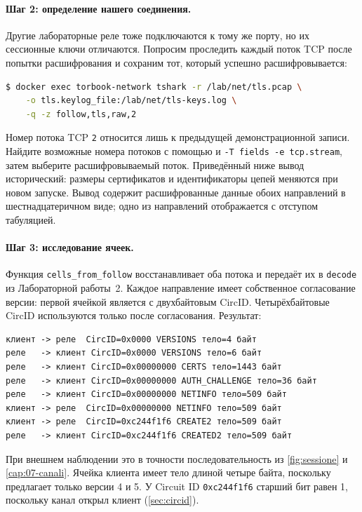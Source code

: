 \paragraph{Шаг 2: определение нашего соединения.} Другие лабораторные реле тоже подключаются к тому же порту, но их сессионные ключи отличаются. Попросим  проследить каждый поток TCP после попытки расшифрования и сохраним тот, который успешно расшифровывается:
\begin{lstlisting}[language=bash,numbers=none]
$ docker exec torbook-network tshark -r /lab/net/tls.pcap \
    -o tls.keylog_file:/lab/net/tls-keys.log \
    -q -z follow,tls,raw,2
\end{lstlisting}
Номер потока TCP \texttt{2} относится лишь к предыдущей демонстрационной записи. Найдите возможные номера потоков с помощью  и \texttt{-T fields -e tcp.stream}, затем выберите расшифровываемый поток. Приведённый ниже вывод исторический: размеры сертификатов и идентификаторы цепей меняются при новом запуске.
Вывод содержит расшифрованные данные обоих направлений в шестнадцатеричном виде; одно из направлений отображается с отступом табуляцией.

\paragraph{Шаг 3: исследование ячеек.} Функция \texttt{cells\_from\_follow} восстанавливает оба потока и передаёт их в \texttt{decode} из Лабораторной работы~2. Каждое направление имеет собственное согласование версии: первой ячейкой является  с двухбайтовым CircID. Четырёхбайтовые CircID используются только после согласования. Результат:
\begin{lstlisting}[numbers=none]
клиент -> реле  CircID=0x0000 VERSIONS тело=4 байт
реле   -> клиент CircID=0x0000 VERSIONS тело=6 байт
реле   -> клиент CircID=0x00000000 CERTS тело=1443 байт
реле   -> клиент CircID=0x00000000 AUTH_CHALLENGE тело=36 байт
реле   -> клиент CircID=0x00000000 NETINFO тело=509 байт
клиент -> реле  CircID=0x00000000 NETINFO тело=509 байт
клиент -> реле  CircID=0xc244f1f6 CREATE2 тело=509 байт
реле   -> клиент CircID=0xc244f1f6 CREATED2 тело=509 байт
\end{lstlisting}
При внешнем наблюдении это в точности последовательность из \cref{fig:sessione} и \cref{cap:07-canali}. Ячейка клиента  имеет тело длиной четыре байта, поскольку  предлагает только версии 4 и 5. У Circuit ID \texttt{0xc244f1f6} старший бит равен 1, поскольку канал открыл клиент (\cref{sec:circid}).

